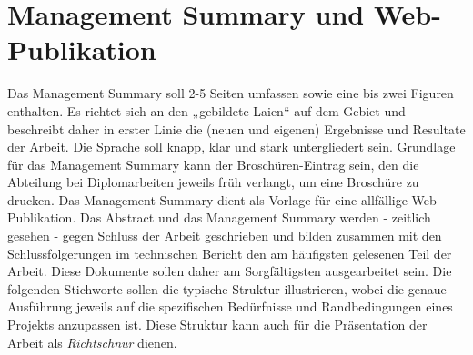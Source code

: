 \chapter*{Management Summary und Web-Publikation}

Das Management Summary soll 2-5 Seiten umfassen sowie eine bis zwei Figuren enthalten. Es richtet sich an den „gebildete Laien“ auf dem Gebiet und beschreibt daher in erster Linie die (neuen und eigenen) Ergebnisse und Resultate der Arbeit. Die Sprache soll knapp, klar und stark untergliedert sein. 
Grundlage für das Management Summary kann der Broschüren-Eintrag sein, den die Abteilung bei Diplomarbeiten jeweils früh verlangt, um eine Broschüre zu drucken. Das Management Summary dient als Vorlage für eine allfällige Web-Publikation.
Das Abstract  und das Management Summary werden - zeitlich gesehen - gegen Schluss der Arbeit geschrieben und bilden zusammen mit den Schlussfolgerungen im technischen Bericht den am häufigsten gelesenen Teil der Arbeit. Diese Dokumente sollen daher am Sorgfältigsten ausgearbeitet sein.
Die folgenden Stichworte sollen die typische Struktur illustrieren, wobei die genaue Ausführung jeweils auf die spezifischen Bedürfnisse und Randbedingungen eines Projekts anzupassen ist. Diese Struktur kann auch für die Präsentation der Arbeit als \emph{Richtschnur} dienen. 
